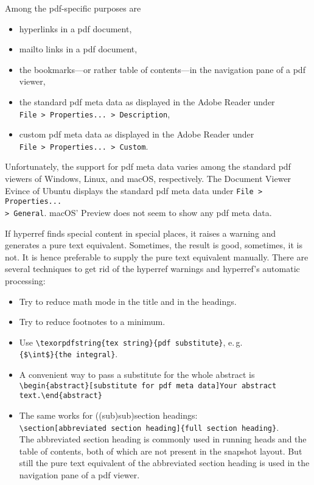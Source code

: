 \documentclass{snapshotmfo}
\begin{document}
\noindent Among the pdf-specific purposes are
\begin{itemize}
  \item hyperlinks in a pdf document,
  \item mailto links in a pdf document,
  \item the bookmarks---or rather table of contents---in the navigation pane of a pdf viewer,
  \item the standard pdf meta data as displayed in the Adobe Reader under\\ \verb+File > Properties... > Description+,
  \item custom pdf meta data as displayed in the Adobe Reader under\\ \verb+File > Properties... > Custom+.
\end{itemize}
Unfortunately, the support for pdf meta data varies among the standard pdf viewers of Windows, Linux, and macOS, respectively.
The Document Viewer Evince of Ubuntu displays the standard pdf meta data under
\verb+File > Properties...+\\ \verb+> General+.
macOS' Preview does not seem to show any pdf meta data.

If hyperref finds special content in special places, it raises a warning and generates a pure text equivalent. Sometimes, the result is good, sometimes, it is not. It is hence preferable to supply the pure text equivalent manually. There are several techniques to get rid of the hyperref warnings and hyperref's automatic processing:
\begin{itemize}
  \item Try to reduce math mode in the title and in the headings.
  \item Try to reduce footnotes to a minimum.
  \item Use \verb+\texorpdfstring{tex string}{pdf substitute}+, e.\,g.\\ \verb+{$\int$}{the integral}+.
  \item A convenient way to pass a substitute for the whole abstract is\\ \verb+\begin{abstract}[substitute for pdf meta data]Your abstract+\\ \verb+text.\end{abstract}+
  \item The same works for ((sub)sub)section headings:\\ \verb+\section[abbreviated section heading]{full section heading}+.\\ The abbreviated section heading is commonly used in running heads and the table of contents, both of which are not present in the snapshot layout. But still the pure text equivalent of the abbreviated section heading is used in the navigation pane of a pdf viewer.
\end{itemize}
\end{document}
